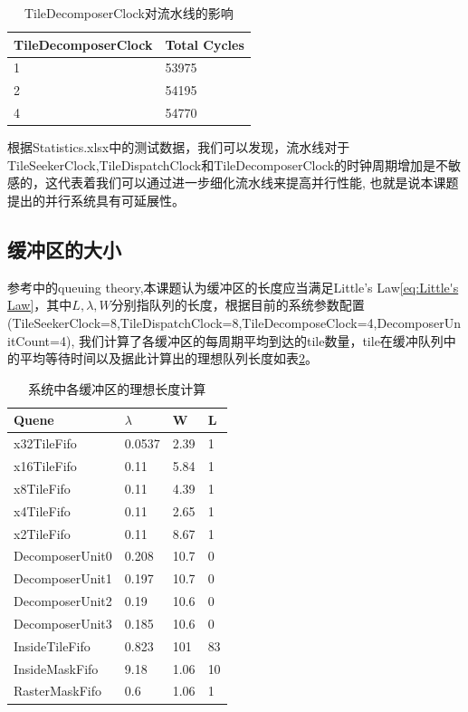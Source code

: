 \begin{table}
    \centering
    \caption{TileDecomposerClock对流水线的影响}
    \label{tab:change decompose clock}
    \begin{tabularx}{\linewidth}{|XX|}
        \hline
        TileDecomposerClock &  Total Cycles \\ \hline
        1 & 53975 \\ \hline
        2 & 54195 \\ \hline
        4 & 54770 \\ \hline
    \end{tabularx}
\end{table}

根据Statistics.xlsx中的测试数据，我们可以发现，流水线对于TileSeekerClock,TileDispatchClock和TileDecomposerClock的时钟周期增加是不敏感的，这代表着我们可以通过进一步细化流水线来提高并行性能, 也就是说本课题提出的并行系统具有可延展性。
\subsection{缓冲区的大小}
参考\cite{CA}中的queuing theory,本课题认为缓冲区的长度应当满足Little's Law\ref{eq:Little's Law}，其中$L,\lambda,W$分别指队列的长度，根据目前的系统参数配置(TileSeekerClock=8,TileDispatchClock=8,TileDecomposeClock=4,DecomposerUnitCount=4), 我们计算了各缓冲区的每周期平均到达的tile数量，tile在缓冲队列中的平均等待时间以及据此计算出的理想队列长度如表\ref{tab:queue length}。

\begin{table}[!ht]
    \centering
    \caption{系统中各缓冲区的理想长度计算}
    \label{tab:queue length}
    \begin{tabularx}{\linewidth}{|XXXX|}
    \hline
        Quene &  $\lambda$ &  W & L \\ \hline
        x32TileFifo & 0.0537 & 2.39 & 1 \\ \hline
        x16TileFifo & 0.11 & 5.84 & 1 \\ \hline
        x8TileFifo & 0.11 & 4.39 & 1 \\ \hline
        x4TileFifo & 0.11 & 2.65 & 1 \\ \hline
        x2TileFifo & 0.11 & 8.67 & 1 \\ \hline
        DecomposerUnit0 & 0.208 & 10.7 & 0 \\ \hline
        DecomposerUnit1 & 0.197 & 10.7 & 0 \\ \hline
        DecomposerUnit2 & 0.19 & 10.6 & 0 \\ \hline
        DecomposerUnit3 & 0.185 & 10.6 & 0 \\ \hline
        InsideTileFifo & 0.823 & 101 & 83 \\ \hline
        InsideMaskFifo & 9.18 & 1.06 & 10 \\ \hline
        RasterMaskFifo & 0.6 & 1.06 & 1 \\ \hline
    \end{tabularx}
\end{table}


